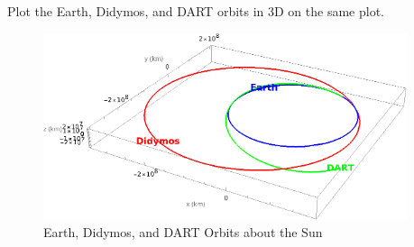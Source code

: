 

%
%

\newcommand{\hmwkTitle}{Homework 00}
\newcommand{\hmwkSubTitle}{Numerical 2BP}
\newcommand{\hmwkDueDate}{February 4th, 2025}
\newcommand{\hmwkDueTime}{11:59 PM}
\newcommand{\hmwkClass}{ENAE 404 - 0101}
\newcommand{\hmwkClassTime}{09:30}
\newcommand{\hmwkClassInstructor}{Dr. Barbee}
\newcommand{\hmwkAuthorName}{\textbf{Vai Srivastava}}
\newcommand{\hmwkCompletionDate}{\today}



\maketitle

\pagebreak

\begin{hwkProblem}{1}{}

	Plot the Earth, Didymos, and DART orbits in 3D on the same plot.

	\hwkSol

	\hwkPart

	\begin{figure}[ht]
		\begin{center}
			\includegraphics[width=0.95\textwidth]{./images/s01.png}
		\end{center}
		\caption{Earth, Didymos, and DART Orbits about the Sun}\label{fig:s01}
	\end{figure}

	\hwkPart
	
	

\end{hwkProblem}

